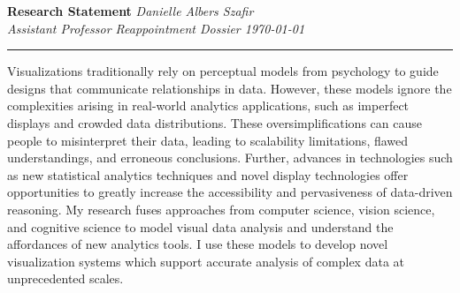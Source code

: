 \documentclass[11pt]{article}
\begin{document}
\setlength{\belowcaptionskip}{-10pt}

\thispagestyle{fancy}

\textbf{\Large Research Statement}
{\hspace{220pt}\emph{Danielle Albers Szafir\\Assistant Professor Reappointment Dossier \hspace{180pt}\today} \vspace{3pt}}
\hrule


Visualizations traditionally rely on perceptual models from psychology to guide designs that communicate relationships in data.  However, these models ignore the complexities arising in real-world analytics applications, such as imperfect displays and crowded data distributions. These oversimplifications can cause people to misinterpret their data, leading to scalability limitations, flawed understandings, and erroneous conclusions. Further, advances in technologies such as new statistical analytics techniques and novel display technologies offer opportunities 
to greatly increase the accessibility and pervasiveness of data-driven reasoning. My research fuses approaches from computer science, vision science, and cognitive science to model visual data analysis and understand the affordances of new analytics tools. I use these models to develop novel visualization systems which support accurate analysis of complex data at unprecedented scales.
\end{document}
